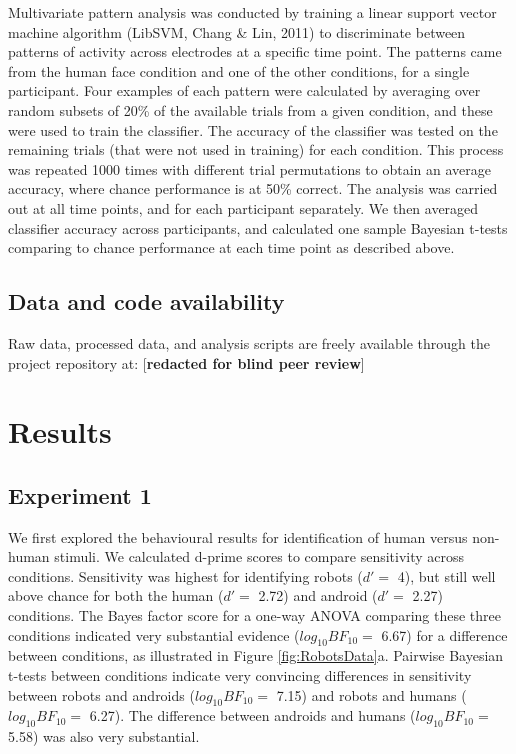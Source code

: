 \documentclass[
]{article}
\begin{document}
Multivariate pattern analysis was conducted by training a linear support vector machine algorithm (LibSVM, Chang \& Lin, 2011) to discriminate between patterns of activity across electrodes at a specific time point. The patterns came from the human face condition and one of the other conditions, for a single participant. Four examples of each pattern were calculated by averaging over random subsets of 20\% of the available trials from a given condition, and these were used to train the classifier. The accuracy of the classifier was tested on the remaining trials (that were not used in training) for each condition. This process was repeated 1000 times with different trial permutations to obtain an average accuracy, where chance performance is at 50\% correct. The analysis was carried out at all time points, and for each participant separately. We then averaged classifier accuracy across participants, and calculated one sample Bayesian t-tests comparing to chance performance at each time point as described above.

\subsection{Data and code availability}\label{data-and-code-availability}

Raw data, processed data, and analysis scripts are freely available through the project repository at: {[}\textbf{redacted for blind peer review}{]}

\section{Results}\label{results}

\subsection{Experiment 1}\label{experiment-1}

We first explored the behavioural results for identification of human versus non-human stimuli. We calculated d-prime scores to compare sensitivity across conditions. Sensitivity was highest for identifying robots (\(d' =\) 4), but still well above chance for both the human (\(d' =\) 2.72) and android (\(d' =\) 2.27) conditions. The Bayes factor score for a one-way ANOVA comparing these three conditions indicated very substantial evidence (\(log_{10}BF_{10} =\) 6.67) for a difference between conditions, as illustrated in Figure \ref{fig:RobotsData}a. Pairwise Bayesian t-tests between conditions indicate very convincing differences in sensitivity between robots and androids (\(log_{10}BF_{10} =\) 7.15) and robots and humans (\(log_{10}BF_{10} =\) 6.27). The difference between androids and humans (\(log_{10}BF_{10} =\) 5.58) was also very substantial.
\end{document}
